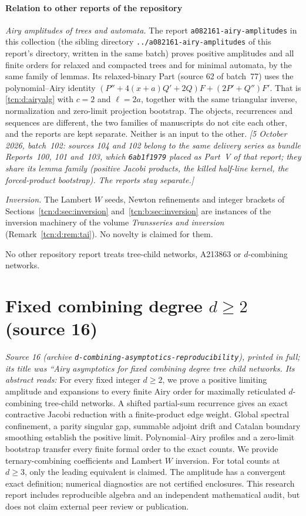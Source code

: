 \documentclass[11pt,letterpaper]{article}
\theoremstyle{remark}
\begin{document}
\subsection{Relation to other reports of the repository}\label{tcn:sec:relation}
\emph{Airy amplitudes of trees and automata.} The report \textup{\nolinkurl{a082161-airy-amplitudes}} in this collection (the sibling directory \nolinkurl{../a082161-airy-amplitudes} of this report's directory, written in the same batch) proves positive amplitudes and all finite orders for relaxed and compacted trees and for minimal automata, by the same family of lemmas. Its relaxed-binary Part (source 62 of batch~77) uses the polynomial--Airy identity $(P''+4(x+a)Q'+2Q)F+(2P'+Q'')F'$. That is \eqref{tcn:d:airyalg} with $c=2$ and $\ell=2a$, together with the same triangular inverse, normalization and zero-limit projection bootstrap. The objects, recurrences and sequences are different, the two families of manuscripts do not cite each other, and the reports are kept separate. Neither is an input to the other.
\emph{[5 October 2026, batch~102: sources 104 and 102 belong to the same delivery series as bundle Reports~100, 101 and~103, which \texttt{6ab1f1979} placed as Part~V of that report; they share its lemma family (positive Jacobi products, the killed half-line kernel, the forced-product bootstrap). The reports stay separate.]}

\emph{Inversion.} The Lambert $W$ seeds, Newton refinements and integer brackets of Sections~\ref{tcn:d:sec:inversion} and~\ref{tcn:b:sec:inversion} are instances of the inversion machinery of the volume \emph{Transseries and inversion} \cite{TAI} (Remark~\ref{tcn:d:rem:tai}). No novelty is claimed for them.

No other repository report treats tree-child networks, A213863 or $d$-combining networks.

\part{Fixed combining degree \texorpdfstring{$d\ge2$}{d >= 2} (source 16)}\label{tcn:part:d}
\emph{Source 16 (archive \textup{\nolinkurl{d-combining-asymptotics-reproducibility}}), printed in full; its title was ``Airy asymptotics for fixed combining degree tree child networks. Its abstract reads:} For every fixed integer $d\ge2$, we prove a positive limiting amplitude and expansions to every finite Airy order for maximally reticulated $d$-combining tree-child networks. A shifted partial-sum recurrence gives an exact contractive Jacobi reduction with a finite-product edge weight. Global spectral confinement, a parity singular gap, summable adjoint drift and Catalan boundary smoothing establish the positive limit. Polynomial--Airy profiles and a zero-limit bootstrap transfer every finite formal order to the exact counts. We provide ternary-combining coefficients and Lambert $W$ inversion. For total counts at $d\ge3$, only the leading equivalent is claimed. The amplitude has a convergent exact definition; numerical diagnostics are not certified enclosures. This research report includes reproducible algebra and an independent mathematical audit, but does not claim external peer review or publication.
\end{document}
